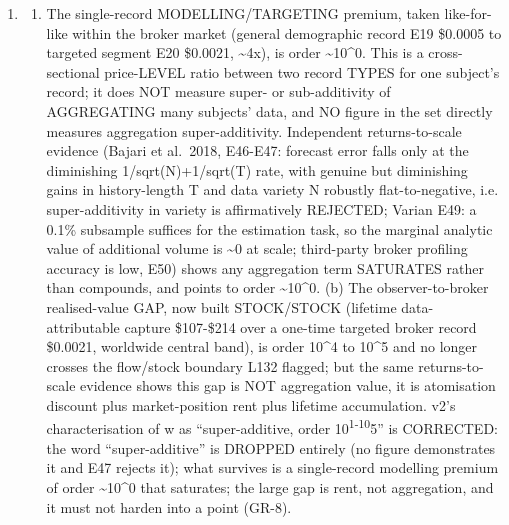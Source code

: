 \documentclass[
  11pt,
]{article}
\providecommand{\tightlist}{%
  \setlength{\itemsep}{0pt}\setlength{\parskip}{0pt}}
\begin{document}
\begin{enumerate}
  \begin{enumerate}
  \def\labelenumii{\alph{enumii}.}
  \setcounter{enumii}{22}
  \tightlist
  \item
    \begin{enumerate}
    \def\labelenumiii{(\alph{enumiii})}
    \tightlist
    \item
      The single-record MODELLING/TARGETING premium, taken like-for-like
      within the broker market (general demographic record E19 \$0.0005
      to targeted segment E20 \$0.0021, \textasciitilde4x), is order
      \textasciitilde10\^{}0. This is a cross-sectional price-LEVEL
      ratio between two record TYPES for one subject's record; it does
      NOT measure super- or sub-additivity of AGGREGATING many subjects'
      data, and NO figure in the set directly measures aggregation
      super-additivity. Independent returns-to-scale evidence (Bajari et
      al.~2018, E46-E47: forecast error falls only at the diminishing
      1/sqrt(N)+1/sqrt(T) rate, with genuine but diminishing gains in
      history-length T and data variety N robustly flat-to-negative,
      i.e. super-additivity in variety is affirmatively REJECTED; Varian
      E49: a 0.1\% subsample suffices for the estimation task, so the
      marginal analytic value of additional volume is \textasciitilde0
      at scale; third-party broker profiling accuracy is low, E50) shows
      any aggregation term SATURATES rather than compounds, and points
      to order \textasciitilde10\^{}0. (b) The observer-to-broker
      realised-value GAP, now built STOCK/STOCK (lifetime
      data-attributable capture \$107-\$214 over a one-time targeted
      broker record \$0.0021, worldwide central band), is order 10\^{}4
      to 10\^{}5 and no longer crosses the flow/stock boundary L132
      flagged; but the same returns-to-scale evidence shows this gap is
      NOT aggregation value, it is atomisation discount plus
      market-position rent plus lifetime accumulation. v2's
      characterisation of w as ``super-additive, order
      10\textsuperscript{1-10}5'' is CORRECTED: the word
      ``super-additive'' is DROPPED entirely (no figure demonstrates it
      and E47 rejects it); what survives is a single-record modelling
      premium of order \textasciitilde10\^{}0 that saturates; the large
      gap is rent, not aggregation, and it must not harden into a point
      (GR-8).
    \end{enumerate}
  \end{enumerate}
\end{enumerate}
\end{document}
